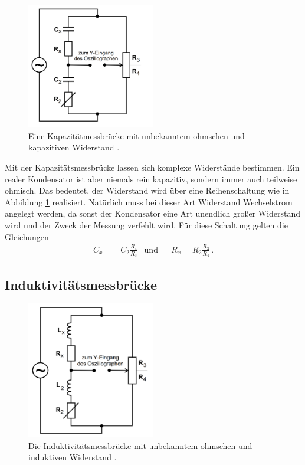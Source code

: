 \begin{figure}
    \centering
    \includegraphics[width=0.5\textwidth]{pictures/Schaltung3.png}
    \caption{Eine Kapazitätmessbrücke mit unbekanntem ohmschen und kapazitiven Widerstand \cite[5]{v302}.}
    \label{fig:Schaltung3}
\end{figure}

Mit der Kapazitätsmessbrücke lassen sich komplexe Widerstände bestimmen. 
Ein realer Kondensator ist aber niemals rein kapazitiv, sondern immer auch teilweise ohmisch.
Das bedeutet, der Widerstand wird über eine Reihenschaltung wie in Abbildung \ref{fig:Schaltung3} realisiert.
Natürlich muss bei dieser Art Widerstand Wechselstrom angelegt werden, da sonst der Kondensator eine Art 
unendlich großer Widerstand wird und der Zweck der Messung verfehlt wird.
Für diese Schaltung gelten die Gleichungen
\begin{align}
    C_x &= C_2 \frac {R_4}{R_3} & \text{und} & &   R_x = R_2 \frac {R_3}{R_4} \, .
\end{align}

\subsection{Induktivitätsmessbrücke}

\begin{figure}
    \centering
    \includegraphics[width=0.5\textwidth]{pictures/Schaltung4.png}
    \caption{Die Induktivitätsmessbrücke mit unbekanntem ohmschen und induktiven Widerstand \cite[6]{v302}.}
    \label{fig:Schaltung4}
\end{figure}

